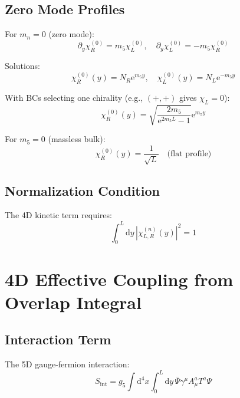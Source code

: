 \documentclass[11pt,a4paper]{article}
\newcommand{\dd}{\mathrm{d}}
\newcommand{\ee}{\mathrm{e}}
\begin{document}
\subsection{Zero Mode Profiles}

For $m_n = 0$ (zero mode):
\begin{equation}
\partial_y \chi_R^{(0)} = m_5 \chi_L^{(0)}, \quad
\partial_y \chi_L^{(0)} = -m_5 \chi_R^{(0)}
\label{eq:zero-mode-eq}
\end{equation}

Solutions:
\begin{equation}
\chi_R^{(0)}(y) = N_R \ee^{m_5 y}, \quad
\chi_L^{(0)}(y) = N_L \ee^{-m_5 y}
\label{eq:zero-mode-sol}
\end{equation}

With BCs selecting one chirality (e.g., $(+,+)$ gives $\chi_L = 0$):
\begin{equation}
\chi_R^{(0)}(y) = \sqrt{\frac{2m_5}{\ee^{2m_5 L} - 1}} \ee^{m_5 y}
\label{eq:zero-mode-normalized}
\end{equation}

For $m_5 = 0$ (massless bulk):
\begin{equation}
\chi_R^{(0)}(y) = \frac{1}{\sqrt{L}} \quad \text{(flat profile)}
\label{eq:flat-zero-mode}
\end{equation}

\subsection{Normalization Condition}

The 4D kinetic term requires:
\begin{equation}
\int_0^L \dd y\, |\chi_{L,R}^{(n)}(y)|^2 = 1
\label{eq:ferm-norm}
\end{equation}

\section{4D Effective Coupling from Overlap Integral}
\label{sec:coupling}

\subsection{Interaction Term}

The 5D gauge-fermion interaction:
\begin{equation}
S_{\text{int}} = g_5 \int \dd^4x \int_0^L \dd y\, \bar{\Psi} \gamma^\mu A_\mu^a T^a \Psi
\label{eq:5d-int}
\end{equation}
\end{document}
